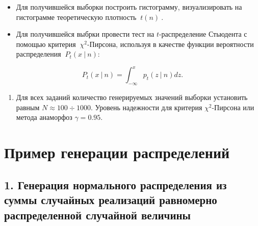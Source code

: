 \documentclass[
]{article}
\providecommand{\tightlist}{%
  \setlength{\itemsep}{0pt}\setlength{\parskip}{0pt}}
\begin{document}
\begin{itemize}
\item
  Для получившейся выборки построить гистограмму, визуализировать на
  гистограмме теоретическую плотность \(\ t(n)\ \).
\item
  Для получившейся выбрки провести тест на \(t\)-распределение Стьюдента
  с помощью критерия \(\ \chi^2\)-Пирсона, используя в качестве функции
  вероятности распределения \(\ P_t(x\ |\ n)\):
\end{itemize}

\[
P_t(x\ |\ n) = \int_{-\infty}^{x} p_t(z\ |\ n) dz.
\]

\begin{enumerate}
\def\labelenumi{\arabic{enumi}.}
\setcounter{enumi}{4}
\tightlist
\item
  Для всех заданий количество генерируемых значений выборки установить
  равным \(N \approx 100 \div 1000\). Уровень надежности для критерия
  \(\chi^2\)-Пирсона или метода анаморфоз \(\gamma = 0.95\).
\end{enumerate}

\hypertarget{ux43fux440ux438ux43cux435ux440-ux433ux435ux43dux435ux440ux430ux446ux438ux438-ux440ux430ux441ux43fux440ux435ux434ux435ux43bux435ux43dux438ux439}{%
\section{\texorpdfstring{\textbf{Пример генерации
распределений}}{Пример генерации распределений}}\label{ux43fux440ux438ux43cux435ux440-ux433ux435ux43dux435ux440ux430ux446ux438ux438-ux440ux430ux441ux43fux440ux435ux434ux435ux43bux435ux43dux438ux439}}

\hypertarget{ux433ux435ux43dux435ux440ux430ux446ux438ux44f-ux43dux43eux440ux43cux430ux43bux44cux43dux43eux433ux43e-ux440ux430ux441ux43fux440ux435ux434ux435ux43bux435ux43dux438ux44f-ux438ux437-ux441ux443ux43cux43cux44b-ux441ux43bux443ux447ux430ux439ux43dux44bux445-ux440ux435ux430ux43bux438ux437ux430ux446ux438ux439-ux440ux430ux432ux43dux43eux43cux435ux440ux43dux43e-ux440ux430ux441ux43fux440ux435ux434ux435ux43bux435ux43dux43dux43eux439-ux441ux43bux443ux447ux430ux439ux43dux43eux439-ux432ux435ux43bux438ux447ux438ux43dux44b}{%
\subsection{\texorpdfstring{\textbf{1. Генерация нормального
распределения из суммы случайных реализаций равномерно распределенной
случайной
величины}}{1. Генерация нормального распределения из суммы случайных реализаций равномерно распределенной случайной величины}}\label{ux433ux435ux43dux435ux440ux430ux446ux438ux44f-ux43dux43eux440ux43cux430ux43bux44cux43dux43eux433ux43e-ux440ux430ux441ux43fux440ux435ux434ux435ux43bux435ux43dux438ux44f-ux438ux437-ux441ux443ux43cux43cux44b-ux441ux43bux443ux447ux430ux439ux43dux44bux445-ux440ux435ux430ux43bux438ux437ux430ux446ux438ux439-ux440ux430ux432ux43dux43eux43cux435ux440ux43dux43e-ux440ux430ux441ux43fux440ux435ux434ux435ux43bux435ux43dux43dux43eux439-ux441ux43bux443ux447ux430ux439ux43dux43eux439-ux432ux435ux43bux438ux447ux438ux43dux44b}}
\end{document}
